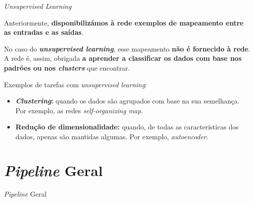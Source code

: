 \begin{frame}{\textit{Unsupervised Learning}}

Anteriormente, \textbf{disponibilizámos à rede exemplos de mapeamento entre as entradas e as saídas}. 

\pauseskip

No caso do \textbf{\textit{unsupervised learning}}, esse mapeamento \textbf{não é fornecido à rede}. A rede é, assim, obrigada \textbf{a aprender a classificar os dados com base nos padrões ou nos \textit{clusters}} que encontrar.

\pauseskip

Exemplos de tarefas com \textit{unsupervised learning}:
\begin{itemize}
    \item \textbf{\textit{Clustering}:} quando os dados são agrupados com base na sua semelhança. Por exemplo, as redes \textit{self-organizing map}.
    \item \textbf{Redução de dimensionalidade:} quando, de todas as características dos dados, apenas são mantidas algumas. Por exemplo, \textit{autoencoder}.
\end{itemize}


\end{frame}

\section{\textit{Pipeline} Geral}

\begin{frame}{\textit{Pipeline} Geral}
    
    \begin{figure}
        \centering
        \resizebox{\textwidth}{!}{
            
        }
    \end{figure}

\end{frame}
